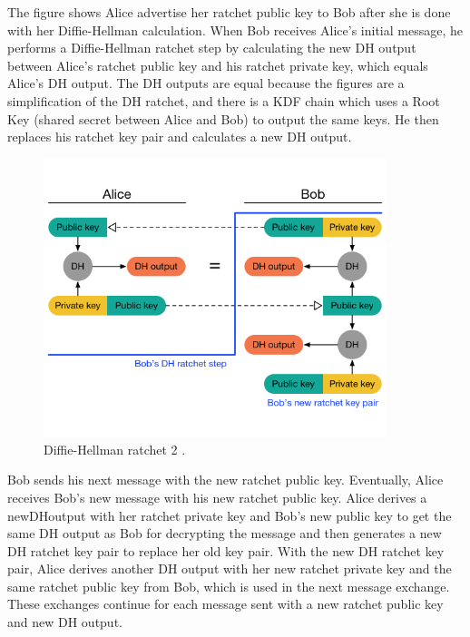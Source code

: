 The figure shows Alice advertise her ratchet public key to Bob after she
is done with her Diffie-Hellman calculation. When Bob receives Alice’s
initial message, he performs a Diffie-Hellman ratchet step by calculating
the new DH output between Alice’s ratchet public key and his ratchet private key, which equals Alice’s DH output. The DH outputs are equal
because the figures are a simplification of the DH ratchet, and there is a
KDF chain which uses a Root Key (shared secret between Alice and Bob) to
output the same keys. He then replaces his ratchet key pair and calculates
a new DH output.

\begin{figure}[H]
	\centering
	\includegraphics[width=10cm]{figures/dhratchet2.png}
	\caption{Diffie-Hellman ratchet 2 \cite{doubleratchet}.}
	\label{fig:dhratchet2}
\end{figure}

Bob sends his next message with the new ratchet public key. Eventually,
Alice receives Bob’s new message with his new ratchet public key. Alice
derives a newDHoutput with her ratchet private key and Bob’s new public
key to get the same DH output as Bob for decrypting the message and then
generates a new DH ratchet key pair to replace her old key pair. With the
new DH ratchet key pair, Alice derives another DH output with her new
ratchet private key and the same ratchet public key from Bob, which is used
in the next message exchange. These exchanges continue for each message
sent with a new ratchet public key and new DH output.



